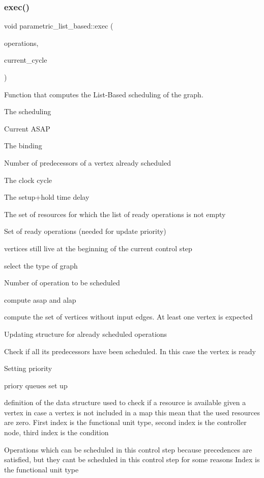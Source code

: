 \subsubsection{\texorpdfstring{exec()}{exec()}}
{\footnotesize\ttfamily void parametric\+\_\+list\+\_\+based\+::exec (\begin{DoxyParamCaption}\item[{const \hyperlink{classOpVertexSet}{Op\+Vertex\+Set} \&}]{operations,  }\item[{Control\+Step}]{current\+\_\+cycle }\end{DoxyParamCaption})}



Function that computes the List-\/\+Based scheduling of the graph. 

The scheduling

Current A\+S\+AP

The binding

Number of predecessors of a vertex already scheduled

The clock cycle

The setup+hold time delay

The set of resources for which the list of ready operations is not empty

Set of ready operations (needed for update priority)

vertices still live at the beginning of the current control step

select the type of graph

Number of operation to be scheduled

compute asap and alap

compute the set of vertices without input edges. At least one vertex is expected

Updating structure for already scheduled operations

Check if all its predecessors have been scheduled. In this case the vertex is ready

Setting priority

priory queues set up

definition of the data structure used to check if a resource is available given a vertex in case a vertex is not included in a map this mean that the used resources are zero. First index is the functional unit type, second index is the controller node, third index is the condition

Operations which can be scheduled in this control step because precedences are satisfied, but they can\textquotesingle{}t be scheduled in this control step for some reasons Index is the functional unit type

